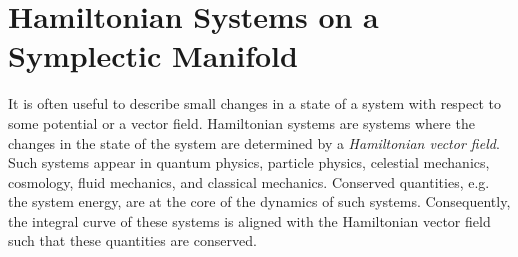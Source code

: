 %

 

\section{Hamiltonian Systems on a Symplectic Manifold} \label{section:2.3}
It is often useful to describe small changes in a state of a system with respect to some potential or a vector field. Hamiltonian systems are systems where the changes in the state of the system are determined by a \emph{Hamiltonian vector field}. Such systems appear in quantum physics, particle physics, celestial mechanics, cosmology, fluid mechanics, and classical mechanics. Conserved quantities, e.g. the system energy, are at the core of the dynamics of such systems. Consequently, the integral curve of these systems is aligned with the Hamiltonian vector field such that these quantities are conserved.

